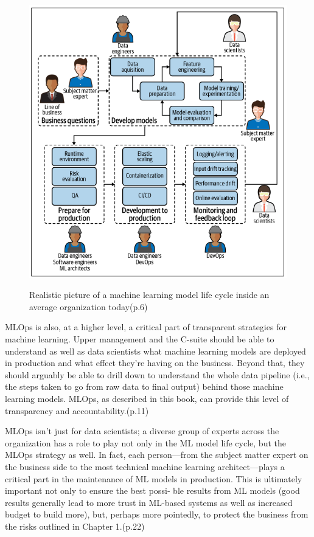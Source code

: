 \begin{figure}[!htbp]
    \caption{Realistic picture of a machine learning model life cycle inside an average
    organization today\cite{treveil2020introducing}(p.6)}
    \centering
    \includegraphics[scale=0.5]{images/mlops-people}
    \label{fig:mlop-people}
\end{figure}

MLOps is also, at a higher level, a critical part of transparent strategies for machine
learning. Upper management and the C-suite should be able to understand as well as
data scientists what machine learning models are deployed in production and what
effect they’re having on the business. Beyond that, they should arguably be able to
drill down to understand the whole data pipeline (i.e., the steps taken to go from raw
data to final output) behind those machine learning models. MLOps, as described in
this book, can provide this level of transparency and accountability.\cite{treveil2020introducing}(p.11)

MLOps isn’t just for data scientists; a diverse group of experts across the organization
has a role to play not only in the ML model life cycle, but the MLOps strategy as well.
In fact, each person—from the subject matter expert on the business side to the most
technical machine learning architect—plays a critical part in the maintenance of ML
models in production. This is ultimately important not only to ensure the best possi‐
ble results from ML models (good results generally lead to more trust in ML-based
systems as well as increased budget to build more), but, perhaps more pointedly, to
protect the business from the risks outlined in Chapter 1.\cite{treveil2020introducing}(p.22)


